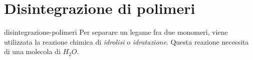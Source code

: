 \documentclass[preview]{standalone}
\begin{document}

\section{Disintegrazione di polimeri}

\begin{snippet}{disintegrazione-polimeri}
    Per separare un legame fra due monomeri, viene utilizzata la reazione chimica di \textit{idrolisi} o \textit{idratazione}.
    Questa reazione necessita di una molecola di \(H_2O\).
\end{snippet}
\end{document}
